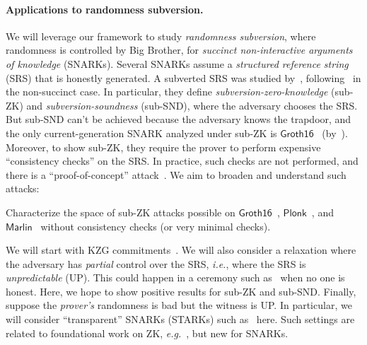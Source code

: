 {\begin{itemize}
\paragraph*{Applications to randomness subversion.} We will leverage our framework to study  \emph{randomness subversion}, where randomness is  controlled by Big Brother, for \emph{succinct non-interactive arguments of knowledge}  (SNARKs). %
Several SNARKs  assume a \emph{structured reference string} (SRS) that is honestly generated.   A subverted SRS was studied  by~\cite{PKC:Fuchsbauer18,JC:ALSZ21}, following~\cite{AC:BelFucSca16} in the non-succinct case. In particular, they define \emph{subversion-zero-knowledge} (sub-ZK) and \emph{subversion-soundness} (sub-SND), where the adversary  chooses the SRS. But sub-SND can't be achieved because the adversary knows the trapdoor, and the only current-generation SNARK analyzed under sub-ZK  is $\mathsf{Groth16}$~\cite{EC:Groth16} (by~\cite{PKC:Fuchsbauer18}). Moreover, to show sub-ZK, they  require the prover to perform expensive ``consistency checks'' on the SRS. In practice,  such checks are not performed, and there is a ``proof-of-concept'' attack~\cite{CCS:Fuchsbauer19}. We aim to broaden and understand such attacks:   %
\begin{task}
    Characterize the space of sub-ZK attacks possible on  $\mathsf{Groth16}$~\cite{EC:Groth16}, $\mathsf{Plonk}$~\cite{EPRINT:GabWilCio19}, and $\mathsf{Marlin}$~\cite{EC:CHMMVW20}  without  consistency checks (or very minimal checks).
\end{task}


We will start with KZG commitments~\cite{AC:ChuKatZho13}.
We will also  consider a relaxation where the adversary  has  \emph{partial}  control over the SRS, \emph{i.e.}, where the SRS is  \emph{unpredictable} (UP). This could happen in a ceremony such as~\cite{AC:KMSV21} when no one is honest. %
Here, we hope to show positive results for sub-ZK and sub-SND.
Finally,  suppose the \emph{prover's} randomness is bad but the witness is UP. In particular, we will consider ``transparent''  SNARKs (STARKs) such as~\cite{C:GLSTW23} here. Such settings are related to foundational work on ZK, \emph{e.g.}~\cite{FOCS:CanPasShe07,EPRINT:DahLin20,TCC:BitCho20}, but   new for SNARKs.


\end{itemize}}

